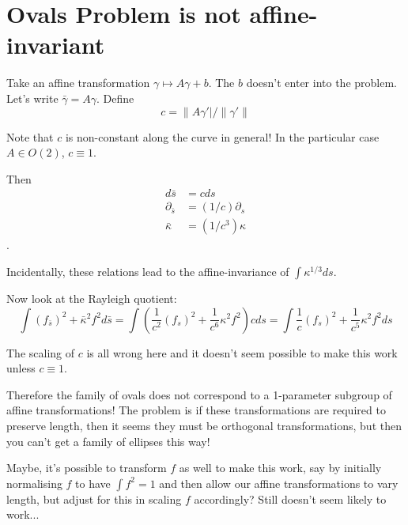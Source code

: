 \documentclass{amsart}
\begin{document}

\section*{Ovals Problem is not affine-invariant}

Take an affine transformation \(\gamma \mapsto A \gamma + b\). The \(b\) doesn't enter into the problem. Let's write \(\bar{\gamma} = A \gamma\). Define
\[
c = \|A\gamma'|/\|\gamma'\|
\]

Note that \(c\) is non-constant along the curve in general! In the particular case \(A \in O(2)\), \(c \equiv 1\).

Then 
\begin{align}
d\bar{s} &= c ds \\
\partial_{\bar{s}} &= (1/c) \partial_s \\ 
\bar{\kappa} &= (1/c^3) \kappa
\end{align}.

Incidentally, these relations lead to the affine-invariance of \(\int \kappa^{1/3} ds\).

Now look at the Rayleigh quotient:
\[
\int (f_{\bar{s}})^2 + \bar{\kappa}^2 f^2 d\bar{s} = \int \left(\frac{1}{c^2} (f_s)^2 + \frac{1}{c^6} \kappa^2 f^2\right) c ds = \int \frac{1}{c} (f_s)^2 + \frac{1}{c^5} \kappa^2 f^2 ds
\]

The scaling of \(c\) is all wrong here and it doesn't seem possible to make this work unless \(c \equiv 1\). 

Therefore the family of ovals does not correspond to a 1-parameter subgroup of affine transformations! The problem is if these transformations are required to preserve length, then it seems they must be orthogonal transformations, but then you can't get a family of ellipses this way!

Maybe, it's possible to transform \(f\) as well to make this work, say by initially normalising \(f\) to have \(\int f^2 = 1\) and then allow our affine transformations to vary length, but adjust for this in scaling \(f\) accordingly? Still doesn't seem likely to work...
\end{document}

